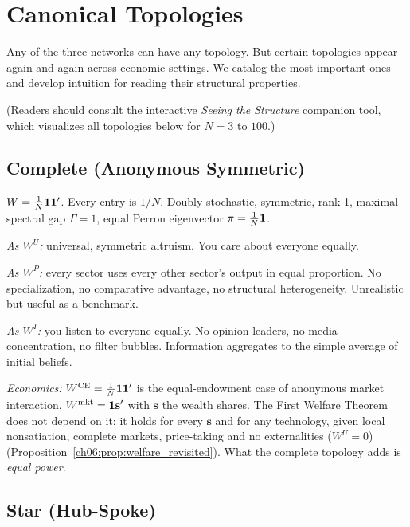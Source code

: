 \documentclass[../structural_economics_book.tex]{subfiles}
\begin{document}
\section{Canonical Topologies}
\label{ch05:sec:topologies}

Any of the three networks can have any topology. But certain topologies appear again and again across economic settings. We catalog the most important ones and develop intuition for reading their structural properties.

(Readers should consult the interactive \textit{Seeing the Structure} companion tool, which visualizes all topologies below for $N = 3$ to $100$.)

\subsection{Complete (Anonymous Symmetric)}

$W = \frac{1}{N}\mathbf{1}\mathbf{1}'$. Every entry is $1/N$. Doubly stochastic, symmetric, rank 1, maximal spectral gap $\Gamma = 1$, equal Perron eigenvector $\pi = \frac{1}{N}\mathbf{1}$.

\textit{As $W^U$:} universal, symmetric altruism. You care about everyone equally.

\textit{As $W^P$:} every sector uses every other sector's output in equal proportion. No specialization, no comparative advantage, no structural heterogeneity. Unrealistic but useful as a benchmark.

\textit{As $W^I$:} you listen to everyone equally. No opinion leaders, no media concentration, no filter bubbles. Information aggregates to the simple average of initial beliefs.

\textit{Economics:} $W^{\text{CE}} = \frac{1}{N}\mathbf{1}\mathbf{1}'$ is the equal-endowment case of anonymous market interaction, $W^{\text{mkt}} = \mathbf{1}\mathbf{s}'$ with $\mathbf{s}$ the wealth shares. The First Welfare Theorem does not depend on it: it holds for every $\mathbf{s}$ and for any technology, given local nonsatiation, complete markets, price-taking and no externalities ($W^U = 0$) (Proposition~\ref{ch06:prop:welfare_revisited}). What the complete topology adds is \textit{equal power}.


\subsection{Star (Hub-Spoke)}
\end{document}
